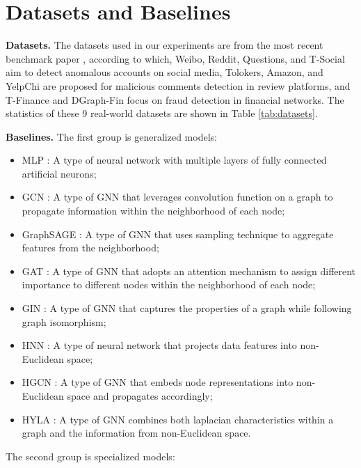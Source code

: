 \section{Datasets and Baselines}
\label{subsec:dataset-baseline}
\textbf{Datasets.} The datasets used in our experiments are from the most recent benchmark paper \citep{gadbench23tang}, according to which, Weibo, Reddit, Questions, and T-Social aim to detect anomalous accounts on social media, Tolokers, Amazon, and YelpChi are proposed for malicious comments detection in review platforms, and T-Finance and DGraph-Fin focus on fraud detection in financial networks. The statistics of these 9 real-world datasets are shown in Table \ref{tab:datasets}. 



\textbf{Baselines.}  The first group is generalized models:
\begin{itemize}[topsep=0.5mm, partopsep=0pt, itemsep=0pt, leftmargin=10pt]
    \item MLP \citep{mlp58f}: A type of neural network with multiple layers of fully connected artificial neurons;
    \item GCN \citep{gcn17kipf}: A type of GNN that leverages convolution function on a graph to propagate information within the neighborhood of each node;
    \item GraphSAGE \citep{graphsage17hamilton}: A type of GNN that uses sampling technique to aggregate features from the neighborhood;
    \item GAT \citep{gat18velickovic}: A type of GNN that adopts an attention mechanism to assign different importance to different nodes within the neighborhood of each node;
    \item GIN \citep{gin19xu}: A type of GNN that captures the properties of a graph while following graph isomorphism;
    \item HNN \citep{hnn18ganea}: A type of neural network that projects data features into non-Euclidean space;
    \item HGCN \citep{hgcn19chami}: A type of GNN that embeds node representations into non-Euclidean space and propagates accordingly;
    \item HYLA \citep{hyla23yu}: A type of GNN combines both laplacian characteristics within a graph and the information from non-Euclidean space.
\end{itemize}
The second group is specialized models:

